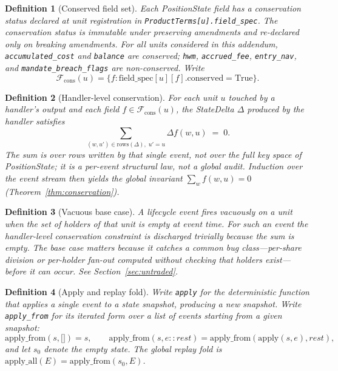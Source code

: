 \documentclass[11pt,a4paper]{article}
\newtheorem{definition}{Definition}[section]
\begin{document}
\begin{definition}[Conserved field set]
\label{def:conservedfields}
Each \textit{PositionState} field has a conservation status declared at unit registration in \texttt{ProductTerms[u].field\_spec}. The conservation status is immutable under preserving amendments and re-declared only on breaking amendments. For all units considered in this addendum, \texttt{accumulated\_cost} and \texttt{balance} are conserved; \texttt{hwm}, \texttt{accrued\_fee}, \texttt{entry\_nav}, and \texttt{mandate\_breach\_flags} are non-conserved. Write
\[
\mathcal{F}_{\mathrm{cons}}(u) = \{f : \mathrm{field\_spec}[u][f].\mathrm{conserved} = \mathrm{True}\}.
\]
\end{definition}

\begin{definition}[Handler-level conservation]
\label{def:handlerconservation}
For each unit $u$ touched by a handler's output and each field $f \in \mathcal{F}_{\mathrm{cons}}(u)$, the \textit{StateDelta} $\Delta$ produced by the handler satisfies
\[
\sum_{(w, u') \in \mathrm{rows}(\Delta),\; u' = u} \Delta f(w, u) \;=\; 0.
\]
The sum is over rows written by that single event, not over the full key space of \textit{PositionState}; it is a per-event structural law, not a global audit. Induction over the event stream then yields the global invariant $\sum_w f(w, u) = 0$ (Theorem~\ref{thm:conservation}).
\end{definition}

\begin{definition}[Vacuous base case]
\label{def:vacuous}
A lifecycle event fires \emph{vacuously} on a unit when the set of holders of that unit is empty at event time. For such an event the handler-level conservation constraint is discharged trivially because the sum is empty. The base case matters because it catches a common bug class---per-share division or per-holder fan-out computed without checking that holders exist---before it can occur. See Section~\ref{sec:untraded}.
\end{definition}

\begin{definition}[Apply and replay fold]
\label{def:apply}
Write \texttt{apply} for the deterministic function that applies a single event to a state snapshot, producing a new snapshot. Write \texttt{apply\_from} for its iterated form over a list of events starting from a given snapshot:
\[
\mathrm{apply\_from}(s, \texttt{[]}) = s, \qquad \mathrm{apply\_from}(s, e :: \mathit{rest}) = \mathrm{apply\_from}(\mathrm{apply}(s, e), \mathit{rest}),
\]
and let $s_0$ denote the empty state. The global replay fold is $\mathrm{apply\_all}(E) = \mathrm{apply\_from}(s_0, E)$.
\end{definition}
\end{document}
